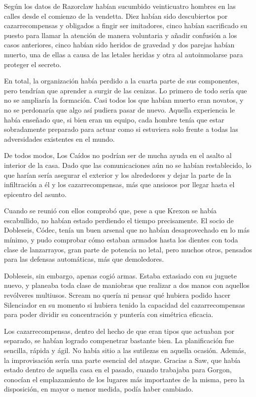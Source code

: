 Según los datos de Razorclaw habían sucumbido veinticuatro hombres en las calles desde el comienzo de la vendetta. Diez habían sido descubiertos por cazarrecompensas y obligados a fingir ser imitadores, cinco habían sacrificado su puesto para llamar la atención de manera voluntaria y añadir confusión a los casos anteriores, cinco habían sido heridos de gravedad y dos parejas habían muerto, una de ellas a causa de las letales heridas y otra al autoinmolarse para proteger el secreto.

En total, la organización había perdido a la cuarta parte de sus componentes, pero tendrían que aprender a surgir de las cenizas. Lo primero de todo sería que no se ampliaría la formación. Casi todos los que habían muerto eran novatos, y no se perdonaría que algo así pudiera pasar de nuevo. Aquella experiencia le había enseñado que, si bien eran un equipo, cada hombre tenía que estar sobradamente preparado para actuar como si estuviera solo frente a todas las adversidades existentes en el mundo.

De todos modos, Los Caídos no podrían ser de mucha ayuda en el asalto al interior de la casa. Dado que las comunicaciones aún no se habían restablecido, lo que harían sería asegurar el exterior y los alrededores y dejar la parte de la infiltración a él y los cazarrecompensas, más que ansiosos por llegar hasta el epicentro del asunto.

Cuando se reunió con ellos comprobó que, pese a que Krexon se había escabullido, no habían estado perdiendo el tiempo precisamente. El socio de Dobleseis, Códec, tenía un buen arsenal que no habían desaprovechado en lo más mínimo, y pudo comprobar cómo estaban armados hasta los dientes con toda clase de lanzarrayos, gran parte de potencia no letal, pero muchos otros, pensados para las defensas automáticas, más que demoledores.

Dobleseis, sin embargo, apenas cogió armas. Estaba extasiado con su juguete nuevo, y planeaba toda clase de maniobras que realizar a dos manos con aquellos revólveres multiusos. Scream no quería ni pensar qué hubiera podido hacer Silenciador en su momento si hubiera tenido la capacidad del cazarrecompensas para poder dividir su concentración y puntería con simétrica eficacia.

Los cazarrecompensas, dentro del hecho de que eran tipos que actuaban por separado, se habían logrado compenetrar bastante bien. La planificación fue sencilla, rápida y ágil. No había sitio a las sutilezas en aquella ocasión. Además, la improvisación sería una parte esencial del ataque. Gracias a Saw, que había estado dentro de aquella casa en el pasado, cuando trabajaba para Gorgon, conocían el emplazamiento de los lugares más importantes de la misma, pero la disposición, en mayor o menor medida, podía haber cambiado.

